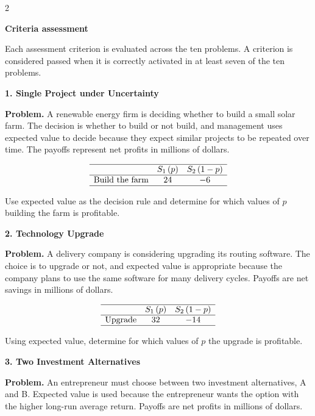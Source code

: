 \documentclass[12pt]{article}
\newcommand{\SubsectionBox}[1]{%
	\noindent\colorbox{gray!30}{%
		\parbox{\linewidth}{\textbf{#1}}%
	}\par\vspace{0.35cm}%
}
\begin{document}
	\begin{multicols}{2}
		
		\SubsectionBox{Criteria assessment}\vspace{-0.25cm}
		Each assessment criterion is evaluated across the ten problems. A criterion is considered passed when it is correctly activated in at least seven of the ten problems.
		
		\vspace{0.25cm}
		\SubsectionBox{1. Single Project under Uncertainty}\vspace{-0.25cm}
		\textbf{Problem.}
		A renewable energy firm is deciding whether to build a small solar farm. The decision is whether to build or not build, and management uses expected value to decide because they expect similar projects to be repeated over time. The payoffs represent net profits in millions of dollars.
		
		\[
		\begin{array}{lcc}
			\hline
			& S_1\,(p) & S_2\,(1-p) \\
			\hline
			\text{Build the farm} & 24 & -6 \\
			\hline
		\end{array}
		\]
		
		Use expected value as the decision rule and determine for which values of \(p\) building the farm is profitable.
		
		\vspace{0.25cm}
		\SubsectionBox{2. Technology Upgrade}\vspace{-0.25cm}
		\textbf{Problem.}
		A delivery company is considering upgrading its routing software. The choice is to upgrade or not, and expected value is appropriate because the company plans to use the same software for many delivery cycles. Payoffs are net savings in millions of dollars.
		
		\[
		\begin{array}{lcc}
			\hline
			& S_1\,(p) & S_2\,(1-p) \\
			\hline
			\text{Upgrade} & 32 & -14 \\
			\hline
		\end{array}
		\]
		
		Using expected value, determine for which values of \(p\) the upgrade is profitable.
		
		\vspace{0.25cm}
		\SubsectionBox{3. Two Investment Alternatives}\vspace{-0.25cm}
		\textbf{Problem.}
		An entrepreneur must choose between two investment alternatives, A and B. Expected value is used because the entrepreneur wants the option with the higher long-run average return. Payoffs are net profits in millions of dollars.
		

\end{multicols}
\end{document}
